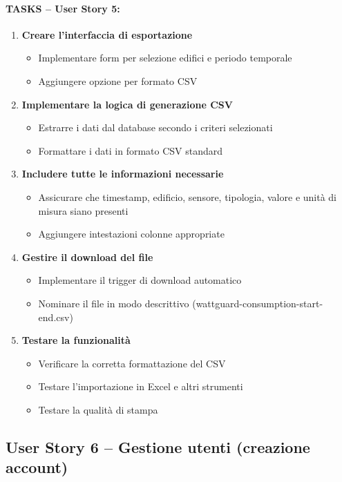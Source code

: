 \paragraph*{TASKS – User Story 5:}
\begin{enumerate}
    \item \textbf{Creare l'interfaccia di esportazione}
    \begin{itemize}
        \item Implementare form per selezione edifici e periodo temporale
        \item Aggiungere opzione per formato CSV
    \end{itemize}
    \item \textbf{Implementare la logica di generazione CSV}
    \begin{itemize}
        \item Estrarre i dati dal database secondo i criteri selezionati
        \item Formattare i dati in formato CSV standard
    \end{itemize}
    \item \textbf{Includere tutte le informazioni necessarie}
    \begin{itemize}
        \item Assicurare che timestamp, edificio, sensore, tipologia, valore e unità di misura siano presenti
        \item Aggiungere intestazioni colonne appropriate
    \end{itemize}
    \item \textbf{Gestire il download del file}
    \begin{itemize}
        \item Implementare il trigger di download automatico
        \item Nominare il file in modo descrittivo (wattguard-consumption-{start}-{end}.csv)
    \end{itemize}
    \item \textbf{Testare la funzionalità}
    \begin{itemize}
        \item Verificare la corretta formattazione del CSV
        \item Testare l'importazione in Excel e altri strumenti
        \item Testare la qualità di stampa
    \end{itemize}
\end{enumerate}


\subsection{User Story 6 – Gestione utenti (creazione account)}
\label{us:creazioneAccount}


